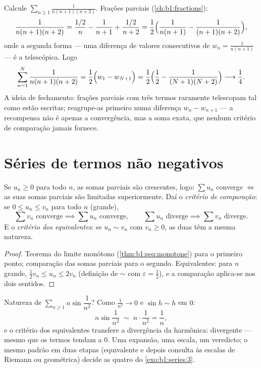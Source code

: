 \begin{example}\label{ex:b1:series:telescope3}
Calcule $\sum_{n\geq1} \frac{1}{n(n+1)(n+2)}$. Frações
parciais (\cref{ch:b1:fractions}):
\[
\frac{1}{n(n+1)(n+2)}
= \frac{1/2}{n} - \frac{1}{n+1} + \frac{1/2}{n+2}
= \frac12\Bigl(\frac{1}{n(n+1)} - \frac{1}{(n+1)(n+2)}\Bigr),
\]
onde a segunda forma --- uma diferença de valores consecutivos de
$w_n = \frac{1}{n(n+1)}$ --- é a telescópica. Logo
\[
\sum_{n=1}^{N} \frac{1}{n(n+1)(n+2)}
= \frac12\Bigl(w_1 - w_{N+1}\Bigr)
= \frac12\Bigl(\frac12 - \frac{1}{(N+1)(N+2)}\Bigr)
\longrightarrow \frac14 .
\]
A ideia de fechamento: frações parciais com três termos raramente
telescopam tal como estão escritas; reagrupe-as primeiro numa
diferença $w_n -
w_{n+1}$ --- a recompensa não é apenas a convergência, mas a
soma exata, que nenhum critério de comparação jamais fornece.
\end{example}

\section{Séries de termos não negativos}

\begin{theorem}\label{thm:b1:series:positive}
Se $u_n \geq 0$ para todo $n$, as somas parciais são crescentes, logo: $\sum
u_n$
converge $\iff$ as suas somas parciais são limitadas superiormente.
Daí o \emph{critério de comparação}: se $0 \leq u_n \leq v_n$ para todo $n$ (grande),
\[
\sum v_n \text{ converge} \implies \sum u_n \text{ converge},
\qquad
\sum u_n \text{ diverge} \implies \sum v_n \text{ diverge}.
\]
E o \emph{critério dos equivalentes}: se $u_n \sim v_n$ com $v_n \geq
0$, as duas
 têm a mesma natureza.
\end{theorem}

\begin{proof}
Teorema do limite monótono (\cref{thm:b1:seq:monotone}) para o primeiro
ponto; comparação das somas parciais para o segundo. Equivalentes:
para $n$ grande, $\frac12 v_n \leq u_n \leq 2 v_n$ (definição de $\sim$
com $\varepsilon = \frac12$), e a comparação aplica-se nos dois sentidos.
\end{proof}

\begin{example}\label{ex:b1:series:equivdiverge}
Natureza de $\sum_{n\geq1} n\sin\dfrac{1}{n^2}$? Como
$\frac{1}{n^2} \to 0$ e $\sin h \sim h$ em $0$:
\[
n\sin\frac{1}{n^2} \;\sim\; n\cdot\frac{1}{n^2} = \frac1n ,
\]
e o critério dos equivalentes transfere a divergência da 
harmônica: divergente --- mesmo que os termos tendam a $0$. Uma
expansão, uma escala, um veredicto; o mesmo padrão em duas etapas
(equivalente e depois consulta às escalas de Riemann ou geométrica)
decide as quatro  do \cref{exo:b1:series:3}.
\end{example}

